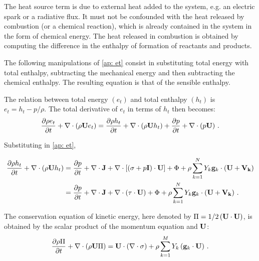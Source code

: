 The heat source term is due to external heat added to the system, e.g. an electric spark or a radiative flux. It must not be confounded with the heat released by combustion (or a chemical reaction), which is already contained in the system in the form of chemical energy. The  heat released in combustion is obtained by computing the difference in the enthalpy of formation of reactants and products.

The following manipulations of \eqref{ap: et} consist in substituting total energy with total enthalpy, subtracting the mechanical energy and then subtracting the chemical enthalpy. The resulting equation is that of the sensible enthalpy.

The relation between total energy $(e_t)$ and total enthalpy $(h_t)$ is $e_t=h_t - p/\rho$. The total derivative of $e_t$ in terms of $h_t$ then becomes:
\begin{equation}
  \frac{\partial \rho e_t}{\partial t} + \nabla \cdot \left( \rho \mathbf{U} e_t\right) =\frac{\partial \rho h_t}{\partial t} + \nabla \cdot \left( \rho \mathbf{U} h_t\right) + \frac{\partial p}{\partial t} + \nabla \cdot \left( p \mathbf{U}\right) \, .
\end{equation}

Substituting in \eqref{ap: et},

\begin{equation}\label{ap: ht}
\begin{split}
 \frac{\partial \rho h_t}{\partial t} + \nabla \cdot \left( \rho \bv{U} h_t\right) &= \frac{\partial p}{\partial t} + \nabla \cdot \bv{J} + \nabla \cdot \left[ \left( \bv{\sigma} + p\bv{I} \right) \cdot \bv{U} \right] + \Phi + \rho \sum_{k=1}^N Y_k \bv{g}_k \cdot \left( \bv{U}+\bv{V_k}\right)  \\
& = \frac{\partial p}{\partial t} + \nabla \cdot \bv{J} + \nabla \cdot \left( \bv{\tau}\cdot \bv{U} \right) + \Phi + \rho \sum_{k=1}^N Y_k \bv{g}_k \cdot \left( \bv{U}+\bv{V_k}\right)
\, .
\end{split}
\end{equation}

The conservation equation of kinetic energy, here denoted by $\Pi = 1/2 \left( \mathbf{U} \cdot \mathbf{U}\right)$, is obtained by the scalar product of the momentum equation and $\mathbf{U}$:
\begin{equation}\label{ap: kinetic}
 \frac{\partial \rho \Pi}{\partial t} + \nabla \cdot \left( \rho \bv{U} \Pi\right) = \bv{U} \cdot \left( \nabla \cdot \sigma \right) +\rho \sum_{k=1}^{M} Y_k \left( \bv{g}_k \cdot \bv{U} \right)  \, .
\end{equation}


